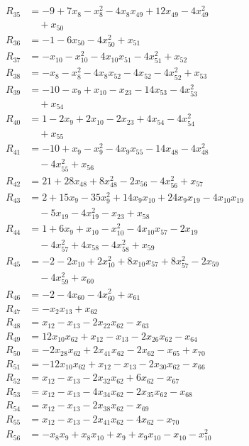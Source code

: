 \begin{align*}
R_{35}&=-9+7x_{8}-x_{8}^{2}-4x_{8}x_{49}+12x_{49}-4x_{49}^{2}\\
&\quad{}+x_{50}\\
R_{36}&=-1-6x_{50}-4x_{50}^{2}+x_{51}\\
R_{37}&=-x_{10}-x_{10}^{2}-4x_{10}x_{51}-4x_{51}^{2}+x_{52}\\
R_{38}&=-x_{8}-x_{8}^{2}-4x_{8}x_{52}-4x_{52}-4x_{52}^{2}+x_{53}\\
R_{39}&=-10-x_{9}+x_{10}-x_{23}-14x_{53}-4x_{53}^{2}\\
&\quad{}+x_{54}\\
R_{40}&=1-2x_{9}+2x_{10}-2x_{23}+4x_{54}-4x_{54}^{2}\\
&\quad{}+x_{55}\\
R_{41}&=-10+x_{9}-x_{9}^{2}-4x_{9}x_{55}-14x_{48}-4x_{48}^{2}\\
&\quad{}-4x_{55}^{2}+x_{56}\\
R_{42}&=21+28x_{48}+8x_{48}^{2}-2x_{56}-4x_{56}^{2}+x_{57}\\
R_{43}&=2+15x_{9}-35x_{9}^{2}+14x_{9}x_{10}+24x_{9}x_{19}-4x_{10}x_{19}\\
&\quad{}-5x_{19}-4x_{19}^{2}-x_{23}+x_{58}\\
R_{44}&=1+6x_{9}+x_{10}-x_{10}^{2}-4x_{10}x_{57}-2x_{19}\\
&\quad{}-4x_{57}^{2}+4x_{58}-4x_{58}^{2}+x_{59}\\
R_{45}&=-2-2x_{10}+2x_{10}^{2}+8x_{10}x_{57}+8x_{57}^{2}-2x_{59}\\
&\quad{}-4x_{59}^{2}+x_{60}\\
R_{46}&=-2-4x_{60}-4x_{60}^{2}+x_{61}\\
R_{47}&=-x_{2}x_{13}+x_{62}\\
R_{48}&=x_{12}-x_{13}-2x_{22}x_{62}-x_{63}\\
R_{49}&=12x_{10}x_{62}+x_{12}-x_{13}-2x_{26}x_{62}-x_{64}\\
R_{50}&=-2x_{28}x_{62}+2x_{41}x_{62}-2x_{62}-x_{65}+x_{70}\\
R_{51}&=-12x_{10}x_{62}+x_{12}-x_{13}-2x_{30}x_{62}-x_{66}\\
R_{52}&=x_{12}-x_{13}-2x_{32}x_{62}+6x_{62}-x_{67}\\
R_{53}&=x_{12}-x_{13}-4x_{34}x_{62}-2x_{35}x_{62}-x_{68}\\
R_{54}&=x_{12}-x_{13}-2x_{38}x_{62}-x_{69}\\
R_{55}&=x_{12}-x_{13}-2x_{41}x_{62}-4x_{62}-x_{70}\\
R_{56}&=-x_{8}x_{9}+x_{8}x_{10}+x_{9}+x_{9}x_{10}-x_{10}-x_{10}^{2}\\

\end{align*}

